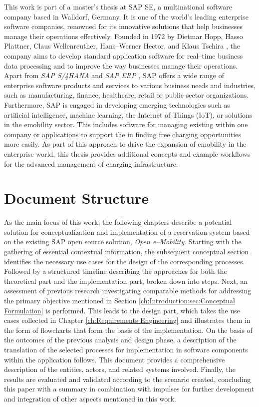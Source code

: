 This work is part of a master's thesis at SAP SE, a multinational software company based in Walldorf, Germany. 
It is one of the world's leading enterprise software companies, renowned for its innovative solutions that help businesses manage their operations effectively. 
Founded in 1972 by Dietmar Hopp, Hasso Plattner, Claus Wellenreuther, Hans--Werner Hector, and Klaus Tschira \cite{noauthor_inventing_nodate}, the company aims to develop standard application software for real--time business data processing and to improve the way businesses manage their operations. 
Apart from \textit{SAP S/4HANA} and \textit{SAP ERP} \cite{noauthor_sap_nodate}, SAP offers a wide range of enterprise software products and services to various business needs and industries, such as manufacturing, finance, healthcare, retail or public sector organizations.
Furthermore, SAP is engaged in developing emerging technologies such as artificial intelligence, machine learning, the Internet of Things (IoT), or solutions in the \acrshort{emobility} sector.
This includes software for managing existing  within one company or applications to support the  in finding free charging opportunities more easily. 
As part of this approach to drive the expansion of \acrshort{emobility} in the enterprise world, this thesis provides additional concepts and example workflows for the advanced management of charging infrastructure. 

\newpage

\section{Document Structure}
\label{ch:Introduction:Document Structure}

As the main focus of this work, the following chapters describe a potential solution for conceptualization and implementation of a reservation system based on the existing SAP open source solution, \textit{Open e--Mobility}. 
Starting with the gathering of essential contextual information, the subsequent conceptual section identifies the necessary use cases for the design of the corresponding processes. 
Followed by a structured timeline describing the approaches for both the theoretical part and the implementation part, broken down into steps. 
Next, an assessment of previous research investigating comparable methods for addressing the primary objective mentioned in Section \ref{ch:Introduction:sec:Conceptual Formulation} is performed.
This leads to the design part, which takes the use cases collected in Chapter \ref{ch:Requirements Engineering} and illustrates them in the form of flowcharts that form the basis of the implementation. 
On the basis of the outcomes of the previous analysis and design phase, a description of the translation of the selected processes for implementation in software components within the application follows. This document provides a comprehensive description of the entities, actors, and related systems involved.
Finally, the results are evaluated and validated according to the scenario created, concluding this paper with a summary in combination with impulses for further development and integration of other aspects mentioned in this work.